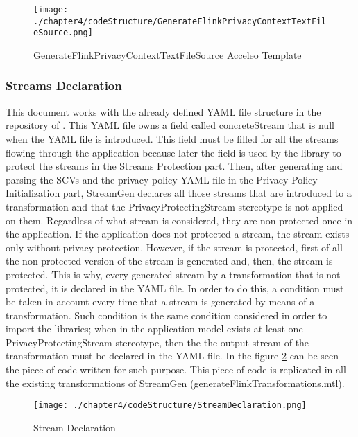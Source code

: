 \begin{figure}
\centering
{\texttt{[image: ./chapter4/codeStructure/GenerateFlinkPrivacyContextTextFileSource.png]}}
\caption{GenerateFlinkPrivacyContextTextFileSource Acceleo Template}
\label{fig:GenerateFlinkPrivacyContextTextFileSource Acceleo Template}
\end{figure}

\subsubsection{Streams Declaration}

This document works with the already defined YAML file structure in the repository of \cite{privacypoliciesarticle}. This YAML file owns a field called concreteStream that is null when the YAML file is introduced. This field must be filled for all the streams flowing through the application because later the field is used by the library to protect the streams in the Streams Protection part. Then, after generating and parsing the SCVs and the privacy policy YAML file in the Privacy Policy Initialization part, StreamGen declares all those streams that are introduced to a transformation and that the PrivacyProtectingStream stereotype is not applied on them. Regardless of what stream is considered, they are non-protected once in the application. If the application does not protected a stream, the stream exists only without privacy protection. However, if the stream is protected, first of all the non-protected version of the stream is generated and, then, the stream is protected. This is why, every generated stream by a transformation that is not protected, it is declared in the YAML file. In order to do this, a condition must be taken in account every time that a stream is generated by means of a transformation. Such condition is the same condition considered in order to import the libraries; when in the application model exists at least one PrivacyProtectingStream stereotype, then the the output stream of the transformation must be declared in the YAML file. In the figure \ref{fig:Stream Declaration} can be seen the piece of code written for such purpose. This piece of code is replicated in all the existing transformations of StreamGen (generateFlinkTransformations.mtl).

\begin{figure}
\centering
{\texttt{[image: ./chapter4/codeStructure/StreamDeclaration.png]}}
\caption{Stream Declaration}
\label{fig:Stream Declaration}
\end{figure}

